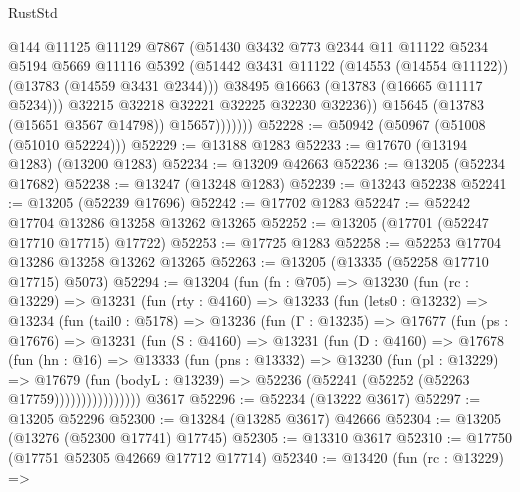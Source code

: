 \begin{lexlean}{RustStd}
\begin{coremodule}
                      @144
                      @11125
                      @11129
                      @7867
                      (@51430
                        @3432
                        @773
                        @2344
                        @11
                        @11122
                        @5234
                        @5194
                        @5669
                        @11116
                        @5392
                        (@51442 @3431 @11122 (@14553 (@14554 @11122)) (@13783 (@14559 @3431 @2344)))
                        @38495
                        @16663
                        (@13783 (@16665 @11117 @5234)))
                      @32215
                      @32218
                      @32221
                      @32225
                      @32230
                      @32236))
                  @15645
                  (@13783 (@15651 @3567 @14798))
                  @15657)))))))
@52228 := @50942 (@50967 (@51008 (@51010 @52224)))
@52229 := @13188 @1283
@52233 := @17670 (@13194 @1283) (@13200 @1283)
@52234 := @13209 @42663
@52236 := @13205 (@52234 @17682)
@52238 := @13247 (@13248 @1283)
@52239 := @13243 @52238
@52241 := @13205 (@52239 @17696)
@52242 := @17702 @1283
@52247 := @52242 @17704 @13286 @13258 @13262 @13265
@52252 := @13205 (@17701 (@52247 @17710 @17715) @17722)
@52253 := @17725 @1283
@52258 := @52253 @17704 @13286 @13258 @13262 @13265
@52263 := @13205 (@13335 (@52258 @17710 @17715) @5073)
@52294 := @13204
    (fun (fn : @705) =>
    @13230
      (fun (rc : @13229) =>
      @13231
        (fun (rty : @4160) =>
        @13233
          (fun (lets0 : @13232) =>
          @13234
            (fun (tail0 : @5178) =>
            @13236
              (fun (Γ : @13235) =>
              @17677
                (fun (ps : @17676) =>
                @13231
                  (fun (S : @4160) =>
                  @13231
                    (fun (D : @4160) =>
                    @17678
                      (fun (hn : @16) =>
                      @13333
                        (fun (pns : @13332) =>
                        @13230
                          (fun (pl : @13229) =>
                          @17679
                            (fun (bodyL : @13239) =>
                            @52236 (@52241 (@52252 (@52263 @17759))))))))))))))))
    @3617
@52296 := @52234 (@13222 @3617)
@52297 := @13205 @52296
@52300 := @13284 (@13285 @3617) @42666
@52304 := @13205 (@13276 (@52300 @17741) @17745)
@52305 := @13310 @3617
@52310 := @17750 (@17751 @52305 @42669 @17712 @17714)
@52340 := @13420
    (fun (rc : @13229) =>

\end{coremodule}
\end{lexlean}

